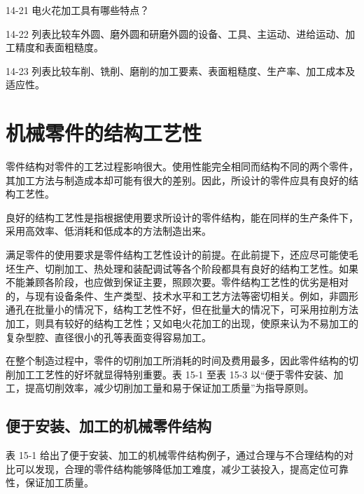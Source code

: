 \documentclass[UTF8]{ctexbook}
\newcommand{\◎}{\ensuremath{\bigcirc}}
\begin{document}
14-21 电火花加工具有哪些特点？

14-22 列表比较车外圆、磨外圆和研磨外圆的设备、工具、主运动、进给运动、加工精度和表面粗糙度。

14-23 列表比较车削、铣削、磨削的加工要素、表面粗糙度、生产率、加工成本及适应性。


\chapter{机械零件的结构工艺性}

零件结构对零件的工艺过程影响很大。使用性能完全相同而结构不同的两个零件，其加工方法与制造成本却可能有很大的差别。因此，所设计的零件应具有良好的结构工艺性。

良好的结构工艺性是指根据使用要求所设计的零件结构，能在同样的生产条件下，采用高效率、低消耗和低成本的方法制造出来。

满足零件的使用要求是零件结构工艺性设计的前提。在此前提下，还应尽可能使毛坯生产、切削加工、热处理和装配调试等各个阶段都具有良好的结构工艺性。如果不能兼顾各阶段，也应做到保证主要，照顾次要。零件结构工艺性的优劣是相对的，与现有设备条件、生产类型、技术水平和工艺方法等密切相关。例如，非圆形通孔在批量小的情况下，结构工艺性不好，但在批量大的情况下，可采用拉削方法加工，则具有较好的结构工艺性；又如电火花加工的出现，使原来认为不易加工的复杂型腔、直径很小的孔等表面变得容易加工。

在整个制造过程中，零件的切削加工所消耗的时间及费用最多，因此零件结构的切削加工工艺性的好坏就显得特别重要。表 15-1 至表 15-3 以“便于零件安装、加工，提高切削效率，减少切削加工量和易于保证加工质量”为指导原则。

\section{便于安装、加工的机械零件结构}

表 15-1 给出了便于安装、加工的机械零件结构例子，通过合理与不合理结构的对比可以发现，合理的零件结构能够降低加工难度，减少工装投入，提高定位可靠性，保证加工质量。
\end{document}
